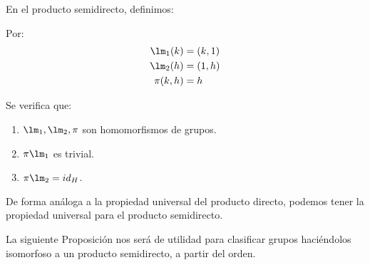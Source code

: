 
\begin{definicion}
    En el producto semidirecto, definimos:
    \begin{figure}[H]
        \centering
    \end{figure}
    Por:
    \begin{align*}
        \lm_1(k) &= (k,1)  \\
        \lm_2(h) &= (1,h)  \\
        \pi(k,h) &= h
    \end{align*}
\end{definicion}

\begin{prop}
    Se verifica que:
    \begin{enumerate}
        \item $\lm_1, \lm_2, \pi$ son homomorfismos de grupos.
        \item $\pi \lm_1$ es trivial.
        \item $\pi\lm_2 = id_H$.
    \end{enumerate}
\end{prop}

\noindent
De forma análoga a la propiedad universal del producto directo, podemos tener la propiedad universal para el producto semidirecto.

\noindent
La siguiente Proposición nos será de utilidad para clasificar grupos haciéndolos isomorfoso a un producto semidirecto, a partir del orden.

